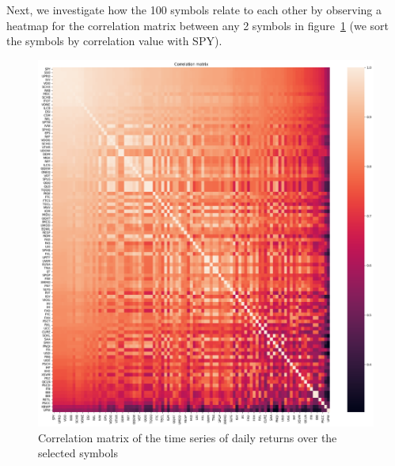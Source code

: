 \documentclass[10pt]{article}
\begin{document}
Next, we investigate how the 100 symbols relate to each other by
observing a heatmap for the correlation matrix between any 2 symbols in
figure~{\ref{293994}} (we sort the symbols by
correlation value with SPY).~
\begin{figure}[H]
\begin{center}
\includegraphics[width=0.98\columnwidth]{figures/output5/output5}
\caption{{Correlation matrix of the time series of daily returns over the selected
symbols
{\label{293994}}%
}}
\end{center}
\end{figure}
\end{document}
